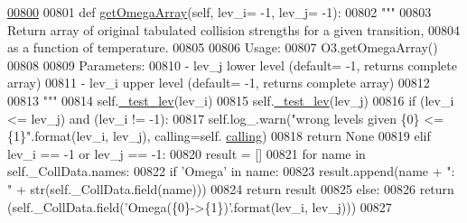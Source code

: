 \begin{DoxyCode}
\hypertarget{classpyneb_1_1core_1_1pynebcore_1_1___coll_data_fits_l00800}{}\hyperlink{classpyneb_1_1core_1_1pynebcore_1_1___coll_data_fits_acca4425c4b7d2e08d0b1b9fe6e1846a7}{00800} 
00801     \textcolor{keyword}{def }\hyperlink{classpyneb_1_1core_1_1pynebcore_1_1___coll_data_fits_acca4425c4b7d2e08d0b1b9fe6e1846a7}{getOmegaArray}(self, lev\_i= -1, lev\_j= -1):
00802         \textcolor{stringliteral}{"""}
00803 \textcolor{stringliteral}{        Return array of original tabulated collision strengths for a given transition, }
00804 \textcolor{stringliteral}{            as a function of temperature.}
00805 \textcolor{stringliteral}{        }
00806 \textcolor{stringliteral}{        Usage:}
00807 \textcolor{stringliteral}{            O3.getOmegaArray()}
00808 \textcolor{stringliteral}{        }
00809 \textcolor{stringliteral}{        Parameters:}
00810 \textcolor{stringliteral}{            - lev\_j  lower level (default= -1, returns complete array)}
00811 \textcolor{stringliteral}{            - lev\_i  upper level (default= -1, returns complete array)}
00812 \textcolor{stringliteral}{}
00813 \textcolor{stringliteral}{        """}
00814         self.\hyperlink{classpyneb_1_1core_1_1pynebcore_1_1___coll_data_fits_a0654555565cc60412d6f639a9a3289ff}{\_test\_lev}(lev\_i)
00815         self.\hyperlink{classpyneb_1_1core_1_1pynebcore_1_1___coll_data_fits_a0654555565cc60412d6f639a9a3289ff}{\_test\_lev}(lev\_j)
00816         \textcolor{keywordflow}{if} (lev\_i <= lev\_j) \textcolor{keywordflow}{and} (lev\_i != -1):
00817             self.log\_.warn(\textcolor{stringliteral}{"wrong levels given \{0\} <= \{1\}"}.format(lev\_i, lev\_j), calling=self.
      \hyperlink{classpyneb_1_1core_1_1pynebcore_1_1___coll_data_fits_a43c9d096f9508cb475cb4fc3552e1979}{calling})
00818             \textcolor{keywordflow}{return} \textcolor{keywordtype}{None}            
00819         \textcolor{keywordflow}{elif} lev\_i == -1 \textcolor{keywordflow}{or} lev\_j == -1:
00820             result = []
00821             \textcolor{keywordflow}{for} name \textcolor{keywordflow}{in} self.\_CollData.names:
00822                 \textcolor{keywordflow}{if} \textcolor{stringliteral}{'Omega'} \textcolor{keywordflow}{in} name:
00823                     result.append(name + \textcolor{stringliteral}{": "} + str(self.\_CollData.field(name)))
00824             \textcolor{keywordflow}{return} result
00825         \textcolor{keywordflow}{else}:
00826             \textcolor{keywordflow}{return} (self.\_CollData.field(\textcolor{stringliteral}{'Omega(\{0\}->\{1\})'}.format(lev\_i, lev\_j)))
00827 

\end{DoxyCode}
